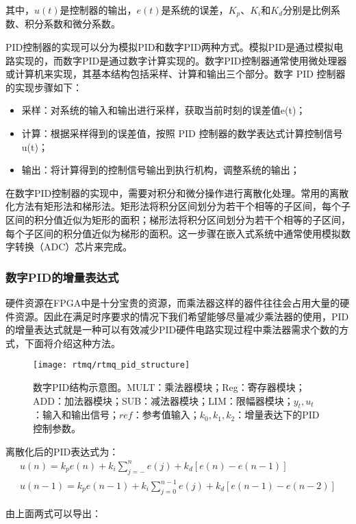 其中，$u(t)$是控制器的输出，$e(t)$是系统的误差，$K_p$、$K_i$和$K_d$分别是比例系数、积分系数和微分系数。
 
PID控制器的实现可以分为模拟PID和数字PID两种方式。模拟PID是通过模拟电路实现的，而数字PID是通过数字计算实现的。数字PID控制器通常使用微处理器或计算机来实现，其基本结构包括采样、计算和输出三个部分。数字 PID 控制器的实现步骤如下：
\begin{itemize}
    \item 采样：对系统的输入和输出进行采样，获取当前时刻的误差值e(t)；
    \item 计算：根据采样得到的误差值，按照 PID 控制器的数学表达式计算控制信号u(t)；
    \item 输出：将计算得到的控制信号输出到执行机构，调整系统的输出；
\end{itemize}

在数字PID控制器的实现中，需要对积分和微分操作进行离散化处理。常用的离散化方法有矩形法和梯形法。矩形法将积分区间划分为若干个相等的子区间，每个子区间的积分值近似为矩形的面积；梯形法将积分区间划分为若干个相等的子区间，每个子区间的积分值近似为梯形的面积。这一步骤在嵌入式系统中通常使用模拟数字转换（ADC）芯片来完成。

\subsubsection[数字PID的增量表达式]{数字PID的增量表达式}
硬件资源在FPGA中是十分宝贵的资源，而乘法器这样的器件往往会占用大量的硬件资源。因此在满足时序要求的情况下我们希望能够尽量减少乘法器的使用，PID的增量表达式就是一种可以有效减少PID硬件电路实现过程中乘法器需求个数的方式，下面将介绍这种方法。

\begin{figure}
    \centering
    \caption[数字PID结构示意图]{数字PID结构示意图。MULT：乘法器模块；Reg：寄存器模块；ADD：加法器模块；SUB：减法器模块；LIM：限幅器模块；$y_t, u_t$：输入和输出信号；$ref$：参考值输入；$k_0, k_1, k_2$：增量表达下的PID控制参数。\label{fig:rtmq_pid_structure}}
    \texttt{[image: rtmq/rtmq\_pid\_structure]}
\end{figure}

离散化后的PID表达式为：
\begin{align}
    u(n)=k_p e(n)+k_i\sum_{j=-}^{n}e(j)+k_d[e(n)-e(n-1)]\\
    u(n-1)=k_p e(n-1)+k_i \sum_{j=0}^{n-1}e(j)+k_d [e(n-1)-e(n-2)]
\end{align}

由上面两式可以导出：

